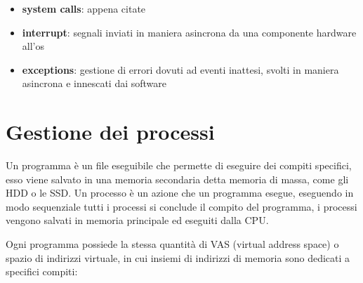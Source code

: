 \documentclass{article}
\begin{document}
        \begin{itemize}
            \item \textbf{system calls}:
                appena citate
                
            \item \textbf{interrupt}:
                segnali inviati in maniera asincrona da una componente hardware all'os

            \item \textbf{exceptions}:
                gestione di errori dovuti ad eventi inattesi, svolti in maniera asincrona e innescati dai software
        \end{itemize}
%
    

\newpage

\section{Gestione dei processi}

    \begin{tcolorbox}[colback= green!10!white, colframe= green!40!black, title=Definizione programmi e processi]
        Un programma è un file eseguibile che permette di eseguire dei compiti specifici, esso viene salvato in una memoria secondaria detta memoria di massa, come gli HDD o le SSD.
        Un processo è un azione che un programma esegue, eseguendo in modo sequenziale tutti i processi si conclude il compito del programma, i processi vengono salvati in memoria principale ed eseguiti dalla CPU. 
        
    \end{tcolorbox}
%
    Ogni programma possiede la stessa quantità di VAS (virtual address space) o spazio di indirizzi virtuale, in cui insiemi di indirizzi di memoria sono dedicati a specifici compiti:
    
\end{document}
